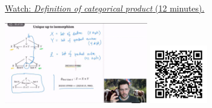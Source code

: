 
\begin{minipage}{10cm}
    \href{https://act4e-spring21.netlify.app/videos/spring2021-products:products:cat-prod:def-prof.html}{Watch: \emph{Definition of categorical product} (12 minutes).}
        
    \href{https://act4e-spring21.netlify.app/videos/spring2021-products:products:cat-prod:def-prof.html}{\includegraphics[height=3.5cm]{spring2021-products:products:cat-prod:def-prof/thumbnails.jpg}}
    \href{https://act4e-spring21.netlify.app/videos/spring2021-products:products:cat-prod:def-prof.html}{\includegraphics[height=2.5cm]{spring2021-products:products:cat-prod:def-prof/qrcode.png}}
\end{minipage}

